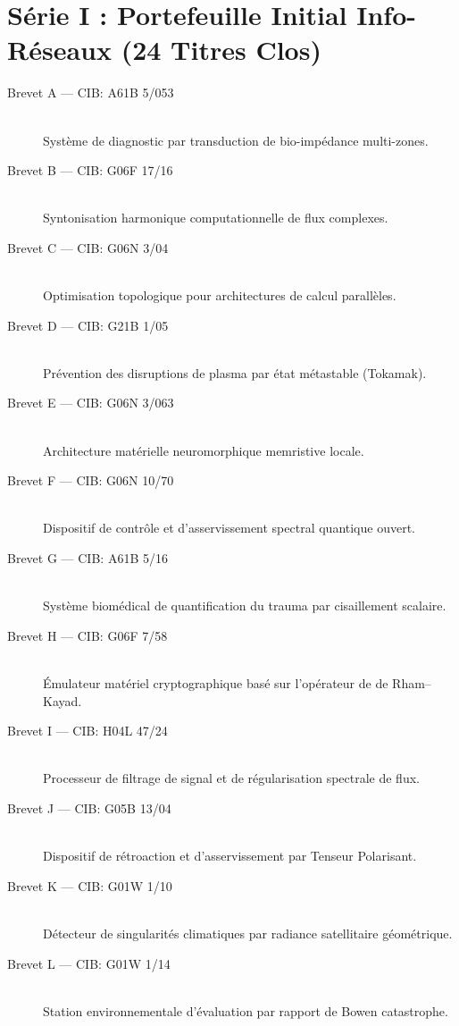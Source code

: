 \section*{Série I : Portefeuille Initial Info-Réseaux (24 Titres Clos)}
\begin{description}
    \item[Brevet A --- CIB: A61B 5/053] \hfill \\ Système de diagnostic par transduction de bio-impédance multi-zones.
    \item[Brevet B --- CIB: G06F 17/16] \hfill \\ Syntonisation harmonique computationnelle de flux complexes.
    \item[Brevet C --- CIB: G06N 3/04] \hfill \\ Optimisation topologique pour architectures de calcul parallèles.
    \item[Brevet D --- CIB: G21B 1/05] \hfill \\ Prévention des disruptions de plasma par état métastable (Tokamak).
    \item[Brevet E --- CIB: G06N 3/063] \hfill \\ Architecture matérielle neuromorphique memristive locale.
    \item[Brevet F --- CIB: G06N 10/70] \hfill \\ Dispositif de contrôle et d'asservissement spectral quantique ouvert.
    \item[Brevet G --- CIB: A61B 5/16] \hfill \\ Système biomédical de quantification du trauma par cisaillement scalaire.
    \item[Brevet H --- CIB: G06F 7/58] \hfill \\ Émulateur matériel cryptographique basé sur l'opérateur de de Rham–Kayad.
    \item[Brevet I --- CIB: H04L 47/24] \hfill \\ Processeur de filtrage de signal et de régularisation spectrale de flux.
    \item[Brevet J --- CIB: G05B 13/04] \hfill \\ Dispositif de rétroaction et d'asservissement par Tenseur Polarisant.
    \item[Brevet K --- CIB: G01W 1/10] \hfill \\ Détecteur de singularités climatiques par radiance satellitaire géométrique.
    \item[Brevet L --- CIB: G01W 1/14] \hfill \\ Station environnementale d'évaluation par rapport de Bowen catastrophe.

\end{description}
